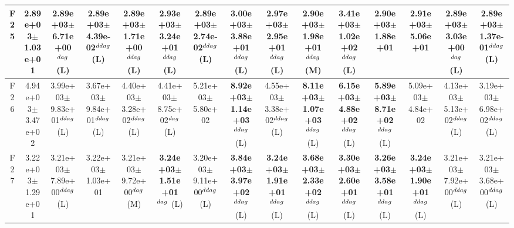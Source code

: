 \begin{table}[!t]
\begin{tabular}{c|cccccccccccccc}
F25  & 2.89e+03$\pm$1.03e+01  & 2.89e+03$\pm$6.71e+00$^{\\dag}$ (L)  & 2.89e+03$\pm$4.39e-02$^{\\ddag}$ (L)  & 2.89e+03$\pm$1.71e+00$^{\\ddag}$ (L)  & \textbf{2.93e+03$\pm$3.24e+01}$^{\\ddag}$ (L)  & 2.89e+03$\pm$2.74e-02$^{\\ddag}$ (L)  & \textbf{3.00e+03$\pm$3.88e+01}$^{\\ddag}$ (L)  & \textbf{2.97e+03$\pm$2.95e+01}$^{\\ddag}$ (L)  & \textbf{2.90e+03$\pm$1.98e+01}$^{\\ddag}$ (M)  & \textbf{3.41e+03$\pm$1.02e+02}$^{\\ddag}$ (L)  & 2.90e+03$\pm$1.88e+01   & 2.91e+03$\pm$5.06e+01   & 2.89e+03$\pm$3.03e+00$^{\\dag}$ (L)  & 2.89e+03$\pm$1.37e-01$^{\\ddag}$ (L) \\ \hline
F26  & 4.94e+03$\pm$3.47e+02  & 3.99e+03$\pm$9.83e+01$^{\\ddag}$ (L)  & 3.67e+03$\pm$9.84e+01$^{\\ddag}$ (L)  & 4.40e+03$\pm$3.28e+02$^{\\ddag}$ (L)  & 4.41e+03$\pm$8.75e+02$^{\\dag}$ (L)  & 5.21e+03$\pm$5.80e+02   & \textbf{8.92e+03$\pm$1.14e+03}$^{\\ddag}$ (L)  & 4.55e+03$\pm$3.38e+02$^{\\ddag}$ (L)  & \textbf{8.11e+03$\pm$1.07e+03}$^{\\ddag}$ (L)  & \textbf{6.15e+03$\pm$4.88e+02}$^{\\ddag}$ (L)  & \textbf{5.89e+03$\pm$8.71e+02}$^{\\ddag}$ (L)  & 5.09e+03$\pm$4.84e+02   & 4.13e+03$\pm$5.13e+02$^{\\ddag}$ (L)  & 3.19e+03$\pm$6.98e+02$^{\\ddag}$ (L) \\ \hline
F27  & 3.22e+03$\pm$1.29e+01  & 3.21e+03$\pm$7.89e+00$^{\\ddag}$ (L)  & 3.22e+03$\pm$1.03e+01   & 3.21e+03$\pm$9.72e+00$^{\\dag}$ (M)  & \textbf{3.24e+03$\pm$1.51e+01}$^{\\dag}$ (L)  & 3.20e+03$\pm$9.11e+00$^{\\ddag}$ (L)  & \textbf{3.84e+03$\pm$3.97e+02}$^{\\ddag}$ (L)  & \textbf{3.24e+03$\pm$1.91e+01}$^{\\ddag}$ (L)  & \textbf{3.68e+03$\pm$2.33e+02}$^{\\ddag}$ (L)  & \textbf{3.30e+03$\pm$2.60e+01}$^{\\ddag}$ (L)  & \textbf{3.26e+03$\pm$3.58e+01}$^{\\ddag}$ (L)  & \textbf{3.24e+03$\pm$1.90e+01}$^{\\ddag}$ (L)  & 3.21e+03$\pm$7.92e+00$^{\\ddag}$ (L)  & 3.21e+03$\pm$3.68e+00$^{\\ddag}$ (L) \\ \hline

\end{tabular}
\end{table}
